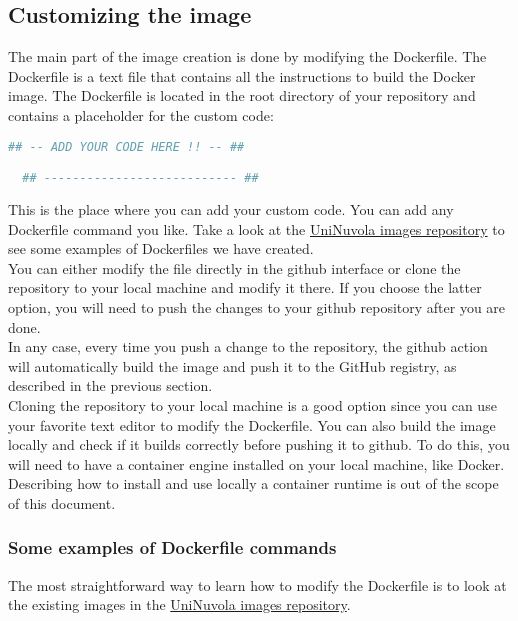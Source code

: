 \subsection{Customizing the image}\label{image_customization}
The main part of the image creation is done by modifying the Dockerfile. The
Dockerfile is a text file that contains all the instructions to build the
Docker image. The Dockerfile is located in the root directory of your
repository and contains a placeholder for the custom code:
\begin{lstlisting}[language=python]
  ## -- ADD YOUR CODE HERE !! -- ##

  ## --------------------------- ##
\end{lstlisting}
This is the place where you can add your custom code. You can add any
Dockerfile command you like. Take a look at the \href{https://github.com/UniNuvola/images}
{UniNuvola images repository} to see some examples of Dockerfiles we have
created. \\
You can either modify the file directly in the github interface or clone the
repository to your local machine and modify it there. If you choose the
latter option, you will need to push the changes to your github repository
after you are done. \\
In any case, every time you push a change to the repository, the github action will
automatically build the image and push it to the GitHub registry, as described in
the previous section. \\
Cloning the repository to your local machine is a good option since you 
can use your favorite text editor to modify the Dockerfile. You can also
build the image locally and check if it builds correctly before pushing it to
github. To do this, you will need to have a container engine installed on
your local machine, like Docker. \\
Describing how to install and use locally a container runtime is out of the scope of this document.

\subsubsection{Some examples of Dockerfile commands}

The most straightforward way to learn how to modify the Dockerfile is to
look at the existing images in the \href{https://github.com/UniNuvola/images}
{UniNuvola images repository}.

